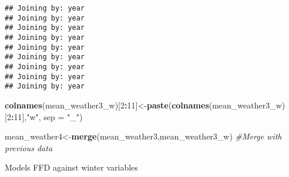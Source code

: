 \documentclass[10pt,]{article}
\newenvironment{Shaded}{\begin{snugshade}}{\end{snugshade}}
\newcommand{\KeywordTok}[1]{\textcolor[rgb]{0.13,0.29,0.53}{\textbf{#1}}}
\newcommand{\DataTypeTok}[1]{\textcolor[rgb]{0.13,0.29,0.53}{#1}}
\newcommand{\DecValTok}[1]{\textcolor[rgb]{0.00,0.00,0.81}{#1}}
\newcommand{\StringTok}[1]{\textcolor[rgb]{0.31,0.60,0.02}{#1}}
\newcommand{\CommentTok}[1]{\textcolor[rgb]{0.56,0.35,0.01}{\textit{#1}}}
\newcommand{\OperatorTok}[1]{\textcolor[rgb]{0.81,0.36,0.00}{\textbf{#1}}}
\newcommand{\NormalTok}[1]{#1}
\begin{document}
\begin{verbatim}
## Joining by: year
## Joining by: year
## Joining by: year
## Joining by: year
## Joining by: year
## Joining by: year
## Joining by: year
## Joining by: year
## Joining by: year
\end{verbatim}

\begin{Shaded}
\begin{Highlighting}[]
\KeywordTok{colnames}\NormalTok{(mean_weather3_w)[}\DecValTok{2}\OperatorTok{:}\DecValTok{11}\NormalTok{]<-}\KeywordTok{paste}\NormalTok{(}\KeywordTok{colnames}\NormalTok{(mean_weather3_w)[}\DecValTok{2}\OperatorTok{:}\DecValTok{11}\NormalTok{],}\StringTok{"w"}\NormalTok{, }\DataTypeTok{sep =} \StringTok{"_"}\NormalTok{)}

\NormalTok{mean_weather4<-}\KeywordTok{merge}\NormalTok{(mean_weather3,mean_weather3_w) }\CommentTok{#Merge with previous data}
\end{Highlighting}
\end{Shaded}

Models FFD against winter variables
\end{document}
